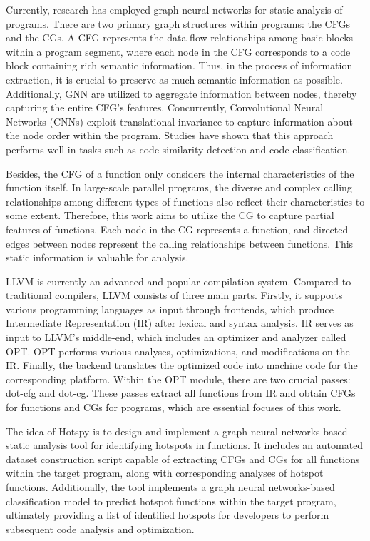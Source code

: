 \documentclass[lineno,sn-mathphys]{sn-jnl}%
\theoremstyle{thmstyleone}%
\theoremstyle{thmstyletwo}%
\theoremstyle{thmstylethree}%
\begin{document}
Currently, research has employed graph neural networks for static analysis of programs. There are two primary graph structures within programs: the CFGs and the CGs. A CFG represents the data flow relationships among basic blocks within a program segment, where each node in the CFG corresponds to a code block containing rich semantic information. Thus, in the process of information extraction, it is crucial to preserve as much semantic information as possible. Additionally, GNN are utilized to aggregate information between nodes, thereby capturing the entire CFG's features. Concurrently, Convolutional Neural Networks (CNNs) exploit translational invariance to capture information about the node order within the program. Studies have shown that this approach performs well in tasks such as code similarity detection and code classification.\par
Besides, the CFG of a function only considers the internal characteristics of the function itself. In large-scale parallel programs, the diverse and complex calling relationships among different types of functions also reflect their characteristics to some extent. Therefore, this work aims to utilize the CG to capture partial features of functions. Each node in the CG represents a function, and directed edges between nodes represent the calling relationships between functions. This static information is valuable for analysis.\par
LLVM is currently an advanced and popular compilation system. Compared to traditional compilers, LLVM consists of three main parts. Firstly, it supports various programming languages as input through frontends, which produce Intermediate Representation (IR) after lexical and syntax analysis. IR serves as input to LLVM's middle-end, which includes an optimizer and analyzer called OPT. OPT performs various analyses, optimizations, and modifications on the IR. Finally, the backend translates the optimized code into machine code for the corresponding platform. Within the OPT module, there are two crucial passes: dot-cfg and dot-cg. These passes extract all functions from IR and obtain CFGs for functions and CGs for programs, which are essential focuses of this work.\par
The idea of Hotspy is to design and implement a graph neural networks-based static analysis tool for identifying hotspots in functions. It includes an automated dataset construction script capable of extracting CFGs and CGs for all functions within the target program, along with corresponding analyses of hotspot functions. Additionally, the tool implements a graph neural networks-based classification model to predict hotspot functions within the target program, ultimately providing a list of identified hotspots for developers to perform subsequent code analysis and optimization.
\end{document}
